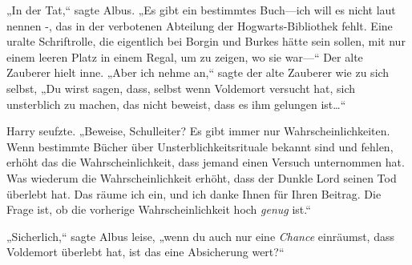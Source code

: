 „In der Tat,“ sagte Albus. „Es gibt ein bestimmtes Buch—ich will es nicht laut nennen -, das in der verbotenen Abteilung der Hogwarts-Bibliothek fehlt. Eine uralte Schriftrolle, die eigentlich bei Borgin und Burkes hätte sein sollen, mit nur einem leeren Platz in einem Regal, um zu zeigen, wo sie war—“ Der alte Zauberer hielt inne. „Aber ich nehme an,“ sagte der alte Zauberer wie zu sich selbst, „Du wirst sagen, dass, selbst wenn Voldemort versucht hat, sich unsterblich zu machen, das nicht beweist, dass es ihm gelungen ist…“

Harry seufzte. „Beweise, Schulleiter? Es gibt immer nur Wahrscheinlichkeiten. Wenn bestimmte Bücher über Unsterblichkeitsrituale bekannt sind und fehlen, erhöht das die Wahrscheinlichkeit, dass jemand einen Versuch unternommen hat. Was wiederum die Wahrscheinlichkeit erhöht, dass der Dunkle Lord seinen Tod überlebt hat. Das räume ich ein, und ich danke Ihnen für Ihren Beitrag. Die Frage ist, ob die vorherige Wahrscheinlichkeit hoch \emph{genug} ist.“

„Sicherlich,“ sagte Albus leise, „wenn du auch nur eine \emph{Chance} einräumst, dass Voldemort überlebt hat, ist das eine Absicherung wert?“

